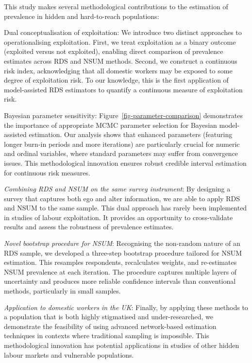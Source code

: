 \documentclass[
  12pt,
  letterpaper,
  DIV=11,
  numbers=noendperiod]{scrartcl}
\theoremstyle{plain}
\theoremstyle{definition}
\begin{document}
This study makes several methodological contributions to the estimation
of prevalence in hidden and hard-to-reach populations:

Dual conceptualisation of exploitation: We introduce two distinct
approaches to operationalising exploitation. First, we treat
exploitation as a binary outcome (exploited versus not exploited),
enabling direct comparison of prevalence estimates across RDS and NSUM
methods. Second, we construct a continuous risk index, acknowledging
that all domestic workers may be exposed to some degree of exploitation
risk. To our knowledge, this is the first application of model-assisted
RDS estimators to quantify a continuous measure of exploitation risk.

Bayesian parameter sensitivity: Figure~\ref{fig-parameter-comparison}
demonstrates the importance of appropriate MCMC parameter selection for
Bayesian model-assisted estimation. Our analysis shows that enhanced
parameters (featuring longer burn-in periods and more iterations) are
particularly crucial for numeric and ordinal variables, where standard
parameters may suffer from convergence issues. This methodological
innovation ensures robust credible interval estimation for continuous
risk measures.

\emph{Combining RDS and NSUM on the same survey instrument}: By
designing a survey that captures both ego and alter information, we are
able to apply RDS and NSUM to the same sample. This dual approach has
rarely been implemented in studies of labour exploitation. It provides
an opportunity to cross-validate results and assess the robustness of
prevalence estimates.

\emph{Novel bootstrap procedure for NSUM}: Recognising the non-random
nature of an RDS sample, we developed a three-step bootstrap procedure
tailored for NSUM estimation. This resamples respondents, recalculates
weights, and re-estimates NSUM prevalence at each iteration. The
procedure captures multiple layers of uncertainty and produces more
reliable confidence intervals than conventional methods, particularly in
small samples.

\emph{Application to domestic workers in the UK}: Finally, by applying
these methods to a population that is both highly stigmatised and
under-researched, we demonstrate the feasibility of using advanced
network-based estimation techniques in contexts where traditional
sampling is impossible. This methodological innovation has potential
applications in studies of other hidden labour markets and vulnerable
populations.
\end{document}
